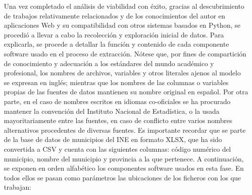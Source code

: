 Una vez completado el análisis de viabilidad con éxito, gracias al descubrimiento de trabajos relativamente relacionados y de los conocimientos del autor en aplicaciones Web y su compatibilidad con otros sistemas basados en Python, se procedió a llevar a cabo la recolección y exploración inicial de datos. Para explicarla, se procede a detallar la función y contenido de cada componente software usado en el proceso de extracción. Nótese que, por fines de compartición de conocimiento y adecuación a los estándares del mundo académico y profesional, los nombres de archivos, variables y otros literales ajenos al modelo se expresan en inglés; mientras que los nombres de las columnas o variables propias de las fuentes de datos mantienen su nombre original en español. Por otra parte, en el caso de nombres escritos en idiomas co-oficiales se ha procurado mantener la convención del Instituto Nacional de Estadística, o la usada mayoritariamente entre las fuentes, en caso de conflicto entre varios nombres alternativos procedentes de diversas fuentes. Es importante recordar que se parte de la base de datos de municipios del INE en formato XLSX, que ha sido convertida a CSV y cuenta con las siguientes columnas: código numérico del municipio, nombre del municipio y provincia a la que pertenece. A continuación, se exponen en orden alfabético los componentes software usados en esta fase. En todos ellos se pasan como parámetros las ubicaciones de los ficheros con los que trabajan:

